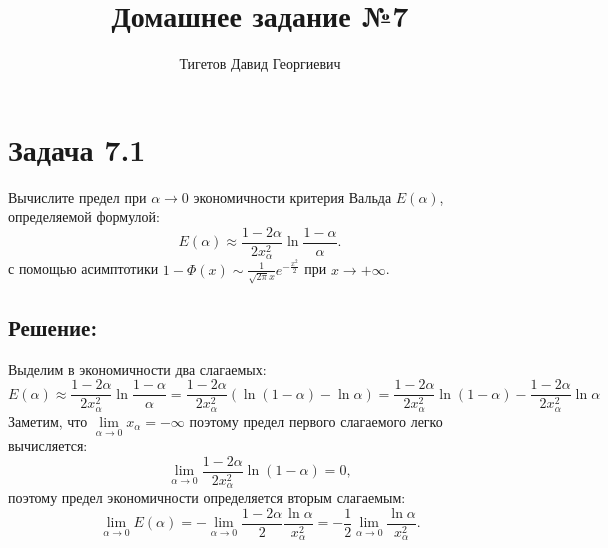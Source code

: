 \documentclass[12pt]{article}
\begin{document}
    \title{Домашнее задание №7}
    \author{Тигетов Давид Георгиевич}
    \date{}
    \maketitle

    \section*{Задача 7.1}
    Вычислите предел при $\alpha \rightarrow 0$ экономичности критерия Вальда $E(\alpha)$, определяемой формулой:
    \[
        E(\alpha) \approx \frac{1 - 2 \alpha}{2 x_\alpha^2} \ln \frac{1 - \alpha}{\alpha} .
    \]
    с помощью асимптотики $1 - \Phi(x) \sim \frac{1}{\sqrt{2 \pi} x} e^{- \frac{x^2}{2}}$ при $x \rightarrow + \infty$.

    \subsection*{Решение:}
    Выделим в экономичности два слагаемых:
    \[
        E(\alpha)
        \approx \frac{1 - 2 \alpha}{2 x_\alpha^2} \ln \frac{1 - \alpha}{\alpha}
        = \frac{1 - 2 \alpha}{2 x_\alpha^2} \left ( \ln \left ( 1 - \alpha \right ) - \ln \alpha \right )
        = \frac{1 - 2 \alpha}{2 x_\alpha^2} \ln \left ( 1 - \alpha \right ) - \frac{1 - 2 \alpha}{2 x_\alpha^2} \ln \alpha
    \]
    Заметим, что $\lim \limits_{\alpha \rightarrow 0} x_\alpha = - \infty$ поэтому предел первого слагаемого легко вычисляется:
    \[
        \lim \limits_{\alpha \rightarrow 0} \frac{1 - 2 \alpha}{2 x_\alpha^2} \ln \left ( 1 - \alpha \right ) = 0 ,
    \]
    поэтому предел экономичности определяется вторым слагаемым:
    \begin{equation} \label{7:limit}
        \lim \limits_{\alpha \rightarrow 0} E(\alpha)
        = - \lim \limits_{\alpha \rightarrow 0} \frac{1 - 2 \alpha}{2} \frac{\ln \alpha}{x_\alpha^2}
        = - \frac{1}{2} \lim \limits_{\alpha \rightarrow 0} \frac{\ln \alpha}{x_\alpha^2} .
    \end{equation}
\end{document}
